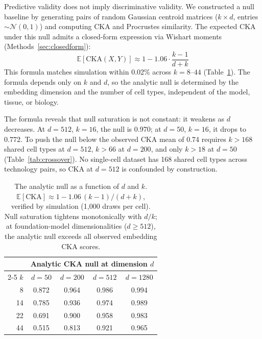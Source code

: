 \documentclass[11pt]{article}
\begin{document}
Predictive validity does not imply discriminative validity. We
constructed a null baseline by generating pairs of random Gaussian
centroid matrices ($k \times d$, entries $\sim \mathcal{N}(0,1)$) and
computing CKA and Procrustes similarity. The expected CKA under this
null admits a closed-form expression via Wishart moments
(Methods~\ref{sec:closedform}):
\begin{equation}
\label{eq:cka_null}
\mathbb{E}[\mathrm{CKA}(X, Y)] \approx 1 - 1.06 \cdot \frac{k-1}{d+k}
\end{equation}
This formula matches simulation within 0.02\% across $k = 8$--$44$
(Table~\ref{tab:nullfloor}). The formula depends only on $k$ and $d$,
so the analytic null is determined by the embedding dimension and the
number of cell types, independent of the model, tissue, or biology.

The formula reveals that null saturation is not constant: it weakens
as $d$ decreases. At $d = 512$, $k = 16$, the null is 0.970; at
$d = 50$, $k = 16$, it drops to 0.772. To push the null below the
observed CKA mean of 0.74 requires $k > 168$ shared cell types at
$d = 512$, $k > 66$ at $d = 200$, and only $k > 18$ at $d = 50$
(Table~\ref{tab:crossover}). No single-cell dataset has 168 shared cell
types across technology pairs, so CKA at $d = 512$ is confounded by
construction.

\medskip
\begin{table}[t]
\centering
\caption{The analytic null as a function of $d$ and $k$.
$\mathbb{E}[\mathrm{CKA}] \approx 1 - 1.06\,(k{-}1)/(d{+}k)$,
verified by simulation (1,000 draws per cell). Null saturation tightens
monotonically with $d/k$; at foundation-model dimensionalities
($d \geq 512$), the analytic null exceeds all observed embedding CKA scores.}
\label{tab:nullfloor}
\small
\begin{tabular}{@{}rcccc@{}}
\toprule
& \multicolumn{4}{c}{Analytic CKA null at dimension $d$} \\
\cmidrule(lr){2-5}
$k$ & $d = 50$ & $d = 200$ & $d = 512$ & $d = 1280$ \\
\midrule
8  & 0.872 & 0.964 & 0.986 & 0.994 \\
14 & 0.785 & 0.936 & 0.974 & 0.989 \\
22 & 0.691 & 0.900 & 0.958 & 0.983 \\
44 & 0.515 & 0.813 & 0.921 & 0.965 \\
\bottomrule
\end{tabular}
\end{table}
\end{document}

